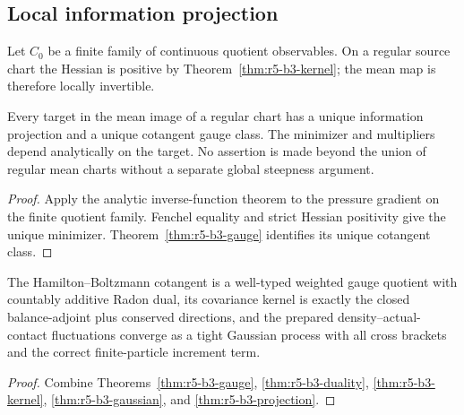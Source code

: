 \subsection{Local information projection}

Let \(C_0\) be a finite family of continuous quotient observables.  On a
regular source chart the Hessian is positive by
Theorem~\ref{thm:r5-b3-kernel}; the mean map is therefore locally invertible.

\begin{theorem}
\label{thm:r5-b3-projection}
Every target in the mean image of a regular chart has a unique information
projection and a unique cotangent gauge class.  The minimizer and multipliers
depend analytically on the target.  No assertion is made beyond the union of
regular mean charts without a separate global steepness argument.
\end{theorem}

\begin{proof}
Apply the analytic inverse-function theorem to the pressure gradient on the
finite quotient family.  Fenchel equality and strict Hessian positivity give
the unique minimizer.  Theorem~\ref{thm:r5-b3-gauge} identifies its unique
cotangent class.
\end{proof}

\begin{theorem}
\label{thm:r5-b3-main}
The Hamilton--Boltzmann cotangent is a well-typed weighted gauge quotient with
countably additive Radon dual, its covariance kernel is exactly the closed
balance-adjoint plus conserved directions, and the prepared density--actual-
contact fluctuations converge as a tight Gaussian process with all cross
brackets and the correct finite-particle increment term.
\end{theorem}

\begin{proof}
Combine Theorems~\ref{thm:r5-b3-gauge},
\ref{thm:r5-b3-duality}, \ref{thm:r5-b3-kernel},
\ref{thm:r5-b3-gaussian}, and \ref{thm:r5-b3-projection}.
\end{proof}
